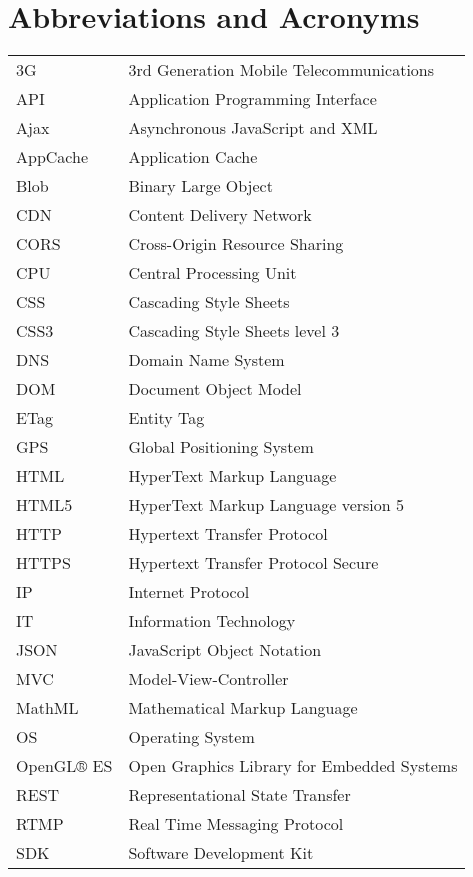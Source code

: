\chapter*{Abbreviations and Acronyms}

\noindent
\begin{longtable}{@{}p{}p{}@{}}

3G & 3rd Generation Mobile Telecommunications\\
API & Application Programming Interface\\
Ajax & Asynchronous JavaScript and XML\\
AppCache & Application Cache\\
Blob & Binary Large Object\\
CDN & Content Delivery Network\\
CORS & Cross-Origin Resource Sharing\\
CPU & Central Processing Unit\\
CSS & Cascading Style Sheets\\
CSS3 & Cascading Style Sheets level 3\\
DNS & Domain Name System\\
DOM & Document Object Model\\
ETag & Entity Tag\\
GPS & Global Positioning System\\
HTML & HyperText Markup Language\\
HTML5 & HyperText Markup Language version 5\\
HTTP & Hypertext Transfer Protocol\\
HTTPS & Hypertext Transfer Protocol Secure\\
IP & Internet Protocol\\
IT & Information Technology\\
JSON & JavaScript Object Notation\\
MVC & Model-View-Controller\\
MathML & Mathematical Markup Language\\
OS & Operating System\\
OpenGL® ES & Open Graphics Library for Embedded Systems\\
REST & Representational State Transfer\\
RTMP & Real Time Messaging Protocol\\
SDK & Software Development Kit\\

\end{longtable}
